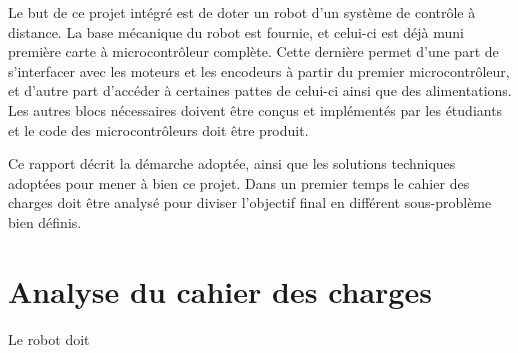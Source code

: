 Le but de ce projet intégré est de doter un robot d'un système de contrôle à distance. La base mécanique du robot est fournie, et celui-ci est déjà muni première carte à microcontrôleur complète. Cette dernière permet d'une part de s'interfacer avec les moteurs et les encodeurs à partir du premier microcontrôleur, et d'autre part d'accéder à certaines pattes de celui-ci ainsi que des alimentations. Les autres blocs nécessaires doivent être conçus et implémentés par les étudiants et le code des microcontrôleurs doit être produit.

Ce rapport décrit la démarche adoptée, ainsi que les solutions techniques adoptées pour mener à bien ce projet. Dans un premier temps le cahier des charges doit être analysé pour diviser l'objectif final en différent sous-problème bien définis.

\section{Analyse du cahier des charges}
Le robot doit